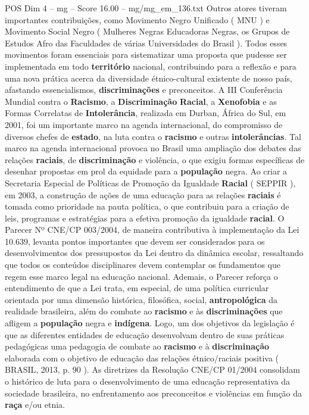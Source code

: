 \begin{textsample}{POS Dim 4 – mg – Score 16.00 – mg/mg\_em\_136.txt}
Outros atores tiveram importantes contribuições, como Movimento Negro Unificado ( MNU ) e Movimento Social Negro ( Mulheres Negras Educadoras Negras, os Grupos de Estudos Afro das Faculdades de várias Universidades do Brasil ).
Todos esses movimentos foram essenciais para sistematizar uma proposta que pudesse ser implementada em todo \textbf{território} nacional, contribuindo para a reflexão e para uma nova prática acerca da diversidade étnico-cultural existente de nosso país, afastando essencialismos, \textbf{discriminações} e preconceitos.
A III Conferência Mundial contra o \textbf{Racismo}, a \textbf{Discriminação} \textbf{Racial}, a \textbf{Xenofobia} e as Formas Correlatas de \textbf{Intolerância}, realizada em Durban, África do Sul, em 2001, foi um importante marco na agenda internacional, do compromisso de diversos chefes de \textbf{estado}, na luta contra o \textbf{racismo} e outras \textbf{intolerâncias}.
Tal marco na agenda internacional provoca no Brasil uma ampliação dos debates das relações \textbf{raciais}, de \textbf{discriminação} e violência, o que exigiu formas específicas de desenhar propostas em prol da equidade para a \textbf{população} negra.
Ao criar a Secretaria Especial de Políticas de Promoção da Igualdade \textbf{Racial} ( SEPPIR ), em 2003, a construção de ações de uma educação para as relações \textbf{raciais} é tomada como prioridade na pauta política, o que contribuiu para a criação de leis, programas e estratégias para a efetiva promoção da igualdade \textbf{racial}.
O Parecer Nº CNE/CP 003/2004, de maneira contributiva à implementação da Lei 10.639, levanta pontos importantes que devem ser considerados para os desenvolvimentos dos pressupostos da Lei dentro da dinâmica escolar, ressaltando que todos os conteúdos disciplinares devem contemplar os fundamentos que regem esse marco legal na educação nacional.
Ademais, o Parecer reforça o entendimento de que a Lei trata, em especial, de uma política curricular orientada por uma dimensão histórica, filosófica, social, \textbf{antropológica} da realidade brasileira, além do combate ao \textbf{racismo} e às \textbf{discriminações} que afligem a \textbf{população} negra e \textbf{indígena}.
Logo, um dos objetivos da legislação é que as diferentes entidades de educação desenvolvam dentro de suas práticas pedagógicas uma pedagogia de combate ao \textbf{racismo} e à \textbf{discriminação} elaborada com o objetivo de educação das relações étnico/raciais positiva ( BRASIL, 2013, p. 90 ).
As diretrizes da Resolução CNE/CP 01/2004 consolidam o histórico de luta para o desenvolvimento de uma educação representativa da sociedade brasileira, no enfrentamento aos preconceitos e violências em função da \textbf{raça} e/ou etnia.

\end{textsample}
